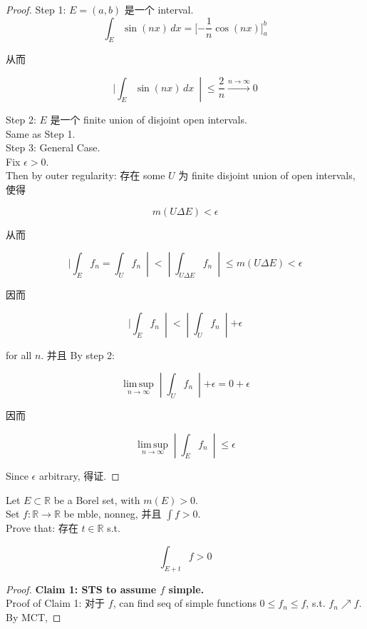 \documentclass{qlnotes-export}
\begin{document}
\begin{proof}

Step 1: \(E = (a,b)\) 是一个 interval.\\

\[\int_{E}\sin(nx)\, dx = \lbrack - \frac{1}{n}\cos(nx)\rbrack_{a}^{b}\]

从而

\[\left. |\int_{E}\sin(nx)\, dx\  \middle| \leq \frac{2}{n}\overset{n\rightarrow\infty}{\rightarrow}0 \right.\]

Step 2: \(E\) 是一个 finite union of disjoint open intervals.\\
Same as Step 1.\\
Step 3: General Case.\\
Fix \(\epsilon > 0\).\\
Then by outer regularity: 存在 some \(U\) 为 finite disjoint union of open intervals, 使得

\[m(U\Delta E) < \epsilon\]

从而

\[\left. |\int_{E}f_{n} = \int_{U}f_{n}\  \middle| < \middle| \int_{U\Delta E}f_{n}\  \middle| \leq m(U\Delta E) < \epsilon \right.\]

因而

\[\left. |\int_{E}f_{n}\  \middle| < \middle| \int_{U}f_{n}\  \middle| + \epsilon \right.\]

for all \(n\). 并且 By step 2:

\[\left. \operatorname{lim\, sup}\limits_{n\rightarrow\infty} \middle| \int_{U}f_{n}\  \middle| + \epsilon = 0 + \epsilon \right.\]

因而

\[\left. \operatorname{lim\, sup}\limits_{n\rightarrow\infty} \middle| \int_{E}f_{n}\  \middle| \leq \epsilon \right.\]

Since \(\epsilon\) arbitrary, 得证.

\end{proof}

\begin{example}

Let \(E \subset {\mathbb{R}}\) be a Borel set, with \(m(E) > 0\).\\
Set \(f:{\mathbb{R}}\rightarrow{\mathbb{R}}\) be mble, nonneg, 并且 \(\int f > 0\).\\
Prove that: 存在 \(t \in {\mathbb{R}}\) s.t.

\[\int_{E + t}f > 0\]

\end{example}

\begin{proof}

\textbf{Claim 1: STS to assume \(f\) simple.}\\
Proof of Claim 1: 对于 \(f\), can find seq of simple functions \(0 \leq f_{n} \leq f\), s.t. \(f_{n}\operatorname{\nearrow ︎}f\).\\
By MCT,

\end{proof}
\end{document}

